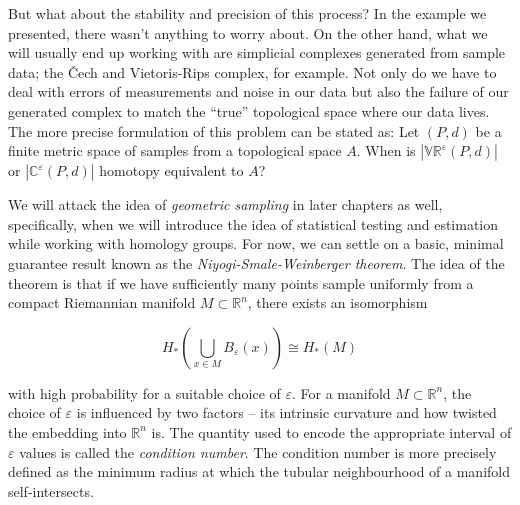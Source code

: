 But what about the stability and precision of this process? In the example we presented, there wasn't anything to worry about. On the other hand, what we will usually end up working with are simplicial complexes generated from sample data; the Čech and Vietoris-Rips complex, for example. Not only do we have to deal with errors of measurements and noise in our data but also the failure of our generated complex to match the ``true'' topological space where our data lives. The more precise formulation of this problem can be stated as: Let $(P, d)$ be a finite metric space of samples from a topological space $A$. When is $|\mathbb{VR}^{\varepsilon}(P, d)|$ or $|\mathbb{C}^{\varepsilon}(P, d)|$ homotopy equivalent to $A$?

We will attack the idea of \textit{geometric sampling} in later chapters as well, specifically, when we will introduce the idea of statistical testing and estimation while working with homology groups. For now, we can settle on a basic, minimal guarantee result known as the \textit{Niyogi-Smale-Weinberger theorem}. The idea of the theorem is that if we have sufficiently many points sample uniformly from a compact Riemannian manifold $M \subset \mathbb{R}^{n}$, there exists an isomorphism

\begin{equation*}
  H_{*}\left(\bigcup_{x \in M} B_{\varepsilon}(x) \right) \cong H_{*}(M)
\end{equation*}

with high probability for a suitable choice of $\varepsilon$. For a manifold $M \subset \mathbb{R}^{n}$, the choice of $\varepsilon$ is influenced by two factors -- its intrinsic curvature and how twisted the embedding into $\mathbb{R}^{n}$ is. The quantity used to encode the appropriate interval of $\varepsilon$ values is called the \textit{condition number}. The condition number is more precisely defined as the minimum radius at which the tubular neighbourhood of a manifold self-intersects.

